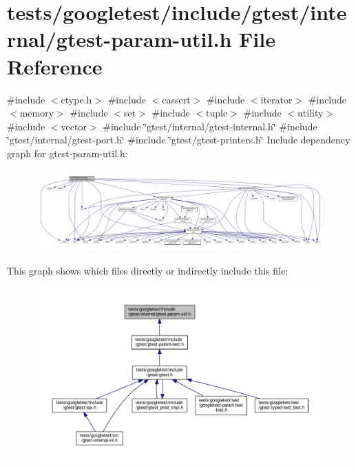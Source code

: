 \hypertarget{gtest-param-util_8h}{}\section{tests/googletest/include/gtest/internal/gtest-\/param-\/util.h File Reference}
\label{gtest-param-util_8h}
{\ttfamily \#include $<$ctype.\+h$>$}\newline
{\ttfamily \#include $<$cassert$>$}\newline
{\ttfamily \#include $<$iterator$>$}\newline
{\ttfamily \#include $<$memory$>$}\newline
{\ttfamily \#include $<$set$>$}\newline
{\ttfamily \#include $<$tuple$>$}\newline
{\ttfamily \#include $<$utility$>$}\newline
{\ttfamily \#include $<$vector$>$}\newline
{\ttfamily \#include \char`\"{}gtest/internal/gtest-\/internal.\+h\char`\"{}}\newline
{\ttfamily \#include \char`\"{}gtest/internal/gtest-\/port.\+h\char`\"{}}\newline
{\ttfamily \#include \char`\"{}gtest/gtest-\/printers.\+h\char`\"{}}\newline
Include dependency graph for gtest-\/param-\/util.h\+:\nopagebreak
\begin{figure}[H]
\begin{center}
\leavevmode
\includegraphics[width=350pt]{gtest-param-util_8h__incl}
\end{center}
\end{figure}
This graph shows which files directly or indirectly include this file\+:\nopagebreak
\begin{figure}[H]
\begin{center}
\leavevmode
\includegraphics[width=350pt]{gtest-param-util_8h__dep__incl}
\end{center}
\end{figure}
